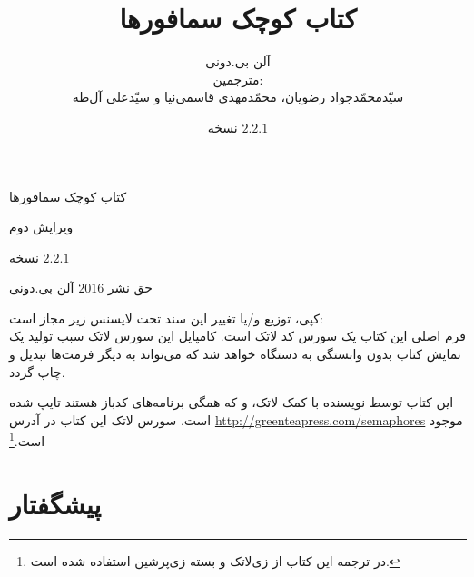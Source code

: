 \documentclass{book}
\title{کتاب کوچک سمافورها}
\author{آلن بی.دونی\\[2cm]
مترجمین:\\
سیّدمحمّدجواد رضویان، محمّدمهدی قاسمی‌نیا و سیّدعلی آل‌طه}
\newcommand{\theversion}{نسخه $2.2.1$}
\begin{document}

\date {\theversion}
\maketitle

\vspace{2in}
\begin{center}
{\Large کتاب کوچک سمافورها}

ویرایش دوم
\vspace{0.25in}

\theversion
\vspace{0.25in}

حق نشر $2016$ آلن بی.دونی
\end{center}
\vspace{0.25in}

کپی، توزیع و/یا تغییر این سند تحت لایسنس زیر مجاز است: \\
فرم اصلی این کتاب یک سورس کد لاتک است. کامپایل این سورس لاتک سبب تولید یک نمایش کتاب بدون وابستگی به دستگاه خواهد شد 
که می‌تواند به دیگر فرمت‌ها تبدیل و چاپ گردد. 

این کتاب توسط نویسنده با کمک لاتک،  و  که همگی برنامه‌های کدباز هستند تایپ شده است. 
سورس لاتک این کتاب در آدرس \url{http://greenteapress.com/semaphores} موجود است.\footnote{در ترجمه این کتاب از زی‌لاتک و بسته 
زی‌پرشین استفاده شده است.}


\frontmatter

\chapter{پیشگفتار}
\end{document}
